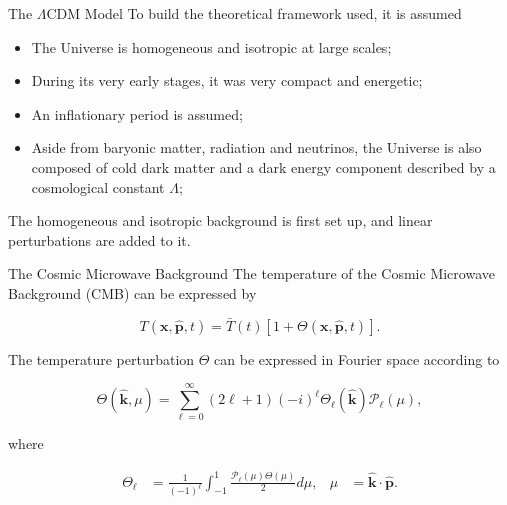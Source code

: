 \documentclass[serif, aspectratio=169]{beamer}
\begin{document}
\begin{frame}{The $\Lambda$CDM Model}
    To build the theoretical framework used, it is assumed

    \begin{itemize}
        \item The Universe is homogeneous and isotropic at large scales; %
        \item During its very early stages, it was very compact and energetic;
        \item An inflationary period is assumed;
        \item Aside from baryonic matter, radiation and neutrinos, the Universe is also composed of cold dark matter and a dark energy component described by a cosmological constant $\Lambda$;
    \end{itemize}

    The homogeneous and isotropic background is first set up, and linear perturbations are added to it.
\end{frame}

\begin{frame}{The Cosmic Microwave Background}
    The temperature of the Cosmic Microwave Background (CMB) can be expressed by

    \begin{equation}\label{eq:temp_def}
        T(\mathbf{x}, \hat{\mathbf{p}}, t)=\bar{T}(t)[1+\Theta(\mathbf{x}, \hat{\mathbf{p}}, t)].
    \end{equation}

    The temperature perturbation $\Theta$ can be expressed in Fourier space according to

    \begin{equation}\label{eq:Theta_expand}
        \Theta(\hat{\mathbf{k}}, \mu)=\sum_{\ell=0}^\infty (2\ell+1)(-i)^\ell \Theta_\ell(\hat{\mathbf{k}})\mathcal{P}_\ell(\mu),
    \end{equation}

    where

    \begin{align}
        \Theta_\ell&=\frac{1}{(-1)^\ell}\int_{-1}^1 \frac{\mathcal{P}_\ell(\mu) \Theta(\mu)}{2}d\mu, & \mu&=\hat{\mathbf{k}}\cdot \hat{\mathbf{p}}. 
    \end{align}
\end{frame}
\end{document}
